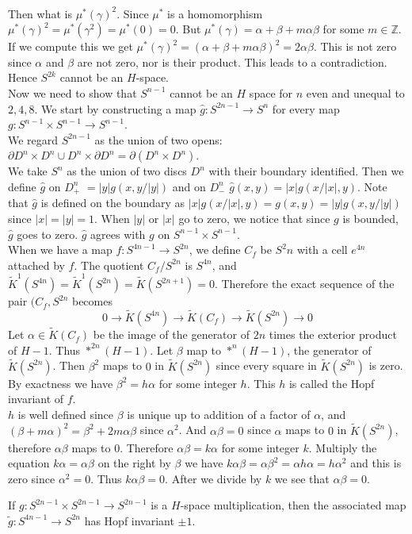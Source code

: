 \documentclass[../Thesis.tex]{subfiles}
\begin{document}
\\Then what is $\mu^*(\gamma)^2$. Since $\mu^* $ is a homomorphism $\mu^ *(\gamma)^2 = \mu^ * (\gamma^2) = \mu^ * (0) = 0$. But $\mu^ *(\gamma) = \alpha + \beta + m \alpha\beta$ for some $m \in \mathbb{Z}$. If we compute this we get $\mu^ *(\gamma)^2 = (\alpha + \beta + m \alpha\beta)^2 = 2 \alpha \beta$. This is not zero since $\alpha$ and $\beta$ are not zero, nor is their product. This leads to a contradiction. Hence $S ^{2k}$ cannot be an $H$-space. 
\\Now we need to show that $S^{n-1}$ cannot be an $H$ space for $n$ even and unequal to $2,4,8$. We start by constructing a map $\hat{g} : S^{2n-1} \rightarrow S^n$ for every map $g : S^ {n-1} \times S^{n-1} \rightarrow S^{n-1}$.
\\We regard $S^{2n-1}$ as the union of two opens: $\partial D^n \times D^n \cup D^n \times \partial D^n = \partial(D^n \times D^n)$.
\\We take $S^n$ as the union of two discs $D^n$ with their boundary identified. Then we define $\hat{g}$ on $D^n_+$ $ = |y| g(x,y/|y|)$ and on $D^n_-$ $\hat{g}(x,y) = |x| g(x/|x|,y)$. Note that $\hat{g}$ is defined on the boundary as $|x|g(x/|x|,y) = g(x,y) = |y|g(x,y/|y|)$ since $|x| = |y| =1$. When $|y|$ or $|x|$ go to zero, we notice that since $g$ is bounded, $\hat{g}$ goes to zero.
$\hat{g}$ agrees with $g$ on $S^{n-1} \times S^{n-1}$.
\\When we have a map $f : S^{4n-1} \rightarrow S^{2n}$, we define $C_f$ be $S^2n$ with a cell $e^{4n}$ attached by $f$. The quotient $C_f/S^{2n}$ is $S^{4n}$, and $\tilde{K}^1(S^{4n}) = \tilde{K}^1(S^{2n}) = \tilde{K}(S^{2n+1}) = 0$. Therefore the exact sequence of the pair $(C_f, S^{2n}$ becomes 
\begin{equation}
0 \rightarrow \tilde{K}(S^{4n}) \rightarrow \tilde{K}(C_f) \rightarrow \tilde{K}(S^{2n}) \rightarrow 0
\end{equation}
Let $\alpha \in \tilde{K}(C_f)$ be the image of the generator of $2n$ times the exterior product of $H-1$. Thus $*^{2n} (H-1)$. Let $\beta$ map to $*^n(H-1)$, the generator of $\tilde{K}(S^{2n})$. Then $\beta^2$ maps to $0$ in $\tilde{K}(S^{2n})$ since every square in $\tilde{K}(S^{2n})$ is zero. By exactness we have $\beta^2 = h \alpha$ for some integer $h$. This $h$ is called the Hopf invariant of $f$.
\\$h$ is well defined since $\beta$ is unique up to addition of a factor of $\alpha$, and $(\beta + m\alpha)^2 = \beta^2 + 2m\alpha\beta$ since $\alpha^2$. And $\alpha\beta = 0$ since $\alpha$ maps to $0$ in $\tilde{K}(S^{2n})$, therefore $\alpha\beta$ maps to $0$. Therefore $\alpha\beta = k\alpha$ for some integer $k$. Multiply the equation $k\alpha = \alpha\beta$ on the right by $\beta$ we have $k\alpha\beta = \alpha\beta^2 = \alpha h \alpha = h\alpha^2$ and this is zero since $\alpha^2 = 0$. Thus $k\alpha\beta = 0$. After we divide by $k$ we see that $\alpha\beta = 0$. 
\begin{lemma}
If $g : S^{2n-1} \times S^{2n-1} \rightarrow S^{2n-1}$ is a $H$-space multiplication, then the associated map $\tilde{g}: S^{4n-1} \rightarrow S^{2n}$ has Hopf invariant $\pm 1$.
\end{lemma}
\end{document}
